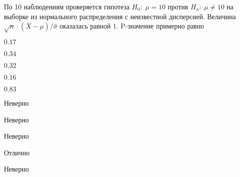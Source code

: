 
\begin{question}
По 10 наблюдениям проверяется гипотеза \(H_0: \; \mu=10\) против
\(H_a: \; \mu \neq 10\) на выборке из нормального распределения с
неизвестной дисперсией. Величина
\(\sqrt{n}\cdot (\bar{X}-\mu)/\hat{\sigma}\) оказалась равной \(1\).
P-значение примерно равно
\begin{answerlist}
  \item \(0.17\)
  \item \(0.34\)
  \item \(0.32\)
  \item \(0.16\)
  \item \(0.83\)
\end{answerlist}
\end{question}

\begin{solution}
\begin{answerlist}
  \item Неверно
  \item Неверно
  \item Неверно
  \item Отлично
  \item Неверно
\end{answerlist}
\end{solution}

